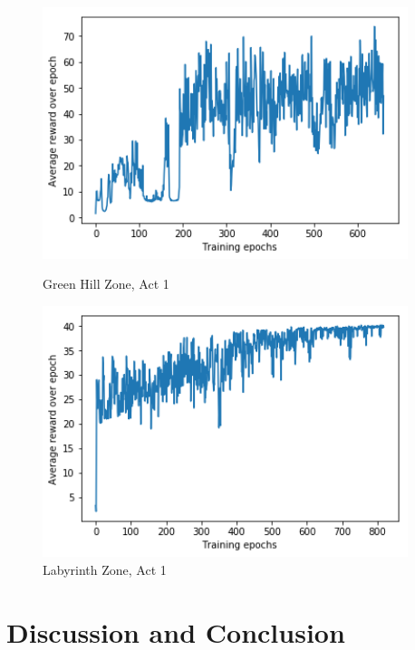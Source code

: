 \documentclass{article}
\begin{document}
\begin{figure}
	\begin{minipage}{0.5\textwidth}
		\begin{center}\includegraphics[width=0.95\textwidth]{greenhillzone.png}\end{center}
		\caption{Green Hill Zone, Act 1}
		\label{fig:ghza1}
	\end{minipage}
	\begin{minipage}{0.5\textwidth}
		\begin{center}\includegraphics[width=0.95\textwidth]{labyrinthzone.png}\end{center}
		\caption{Labyrinth Zone, Act 1}
		\label{fig:lza1}
	\end{minipage}
\end{figure}


\section{Discussion and Conclusion}


\medskip

\small



\end{document}

